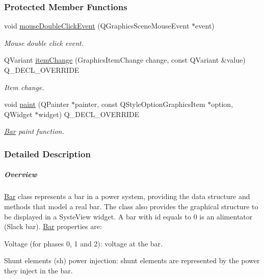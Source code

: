 \subsubsection*{Protected Member Functions}
\begin{DoxyCompactItemize}
\item 
void \hyperlink{group___models_ga1945e7b4401fa9ad7475274d9fb12a72}{mouse\+Double\+Click\+Event} (Q\+Graphics\+Scene\+Mouse\+Event $\ast$event)
\begin{DoxyCompactList}\small\item\em Mouse double click event. \end{DoxyCompactList}\item 
Q\+Variant \hyperlink{group___models_gad97a82d618ee0c51a9a36e44339c69e6}{item\+Change} (Graphics\+Item\+Change change, const Q\+Variant \&value) Q\+\_\+\+D\+E\+C\+L\+\_\+\+O\+V\+E\+R\+R\+I\+D\+E
\begin{DoxyCompactList}\small\item\em Item change. \end{DoxyCompactList}\item 
void \hyperlink{group___models_gacbb6dbac607412c9c1f9dfcd0cd4d432}{paint} (Q\+Painter $\ast$painter, const Q\+Style\+Option\+Graphics\+Item $\ast$option, Q\+Widget $\ast$widget) Q\+\_\+\+D\+E\+C\+L\+\_\+\+O\+V\+E\+R\+R\+I\+D\+E
\begin{DoxyCompactList}\small\item\em \hyperlink{class_bar}{Bar} paint function. \end{DoxyCompactList}\end{DoxyCompactItemize}


\subsubsection{Detailed Description}
\subparagraph*{Overview}

\hyperlink{class_bar}{Bar} class represents a bar in a power system, providing the data structure and methods that model a real bar. The class also provides the graphical structure to be displayed in a Syste\+View widget. A bar with id equals to 0 is an alimentator (Slack bar). \hyperlink{class_bar}{Bar} properties are\+:
\begin{DoxyItemize}
\item Voltage (for phases 0, 1 and 2)\+: voltage at the bar.
\item Shunt elements (sh) power injection\+: shunt elements are represented by the power they inject in the bar.
\end{DoxyItemize}

